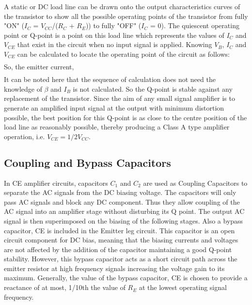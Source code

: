 A static or DC load line can be drawn onto the output characteristics curves of the
transistor to show all the possible operating points of the transistor from fully "ON" ($I_C$ =
$V_{CC}$/($R_C$ + $R_E$)) to fully "OFF" ($I_C$ = 0). The quiescent operating point or Q-point is a
point on this load line which represents the values of $I_C$ and $V_{CE}$ that exist in the circuit
when no input signal is applied. Knowing $V_B$, $I_C$ and $V_{CE}$ can be calculated to locate the
operating point of the circuit as follows:
\begin{align}

\end{align}
So, the emitter current,
\begin{align}

\end{align}
It can be noted here that the sequence of calculation does not need the knowledge of $\beta$
and $I_B$ is not calculated. So the Q-point is stable against any replacement of the transistor.
Since the aim of any small signal amplifier is to generate an amplified input signal at the
output with minimum distortion possible, the best position for this Q-point is as close to
the centre position of the load line as reasonably possible, thereby producing a Class A
type amplifier operation, i.e. $V_{CE} = 1/2V_{CC}$.

\subsection*{Coupling and Bypass Capacitors}

In CE amplifier circuits, capacitors $C_1$ and $C_2$ are used as Coupling Capacitors to separate
the AC signals from the DC biasing voltage. The capacitors will only pass AC signals
and block any DC component. Thus they allow coupling of the AC signal into an
amplifier stage without disturbing its Q point. The output AC signal is then superimposed
on the biasing of the following stages. Also a bypass capacitor, CE is included in the
Emitter leg circuit. This capacitor is an open circuit component for DC bias, meaning that
the biasing currents and voltages are not affected by the addition of the capacitor
maintaining a good Q-point stability. However, this bypass capacitor acts as a short
circuit path across the emitter resistor at high frequency signals increasing the voltage
gain to its maximum. Generally, the value of the bypass capacitor, CE is chosen to
provide a reactance of at most, 1/10th the value of $R_E$ at the lowest operating signal
frequency.

